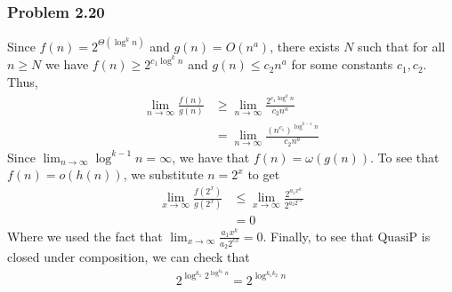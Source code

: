 \subsubsection{Problem 2.20}
Since $f(n) = 2^{\Theta(\log^k n)}$ and $g(n) = O(n^a)$, there exists $N$ such that for all $n \geq N$
we have $f(n) \geq 2^{c_1 \log^k n}$ and $g(n) \leq c_2 n^a$ for some constants $c_1, c_2$. Thus,
\begin{align*}
        \lim_{n \to \infty} \frac{f(n)}{g(n)} &\geq \lim_{n \to \infty} \frac{2^{c_1 \log^k n}}{c_2 n^a} \\
                                              &= \lim_{n \to  \infty} \frac{(n^{c_1})^{\log^{k - 1} n}}{c_2 n^a}
\end{align*}
Since $\lim_{n \to \infty}\log^{k - 1} n = \infty$, we have that $f(n) = \omega(g(n))$. To see that 
$f(n) = o(h(n))$, we substitute $n = 2^x$ to get
\begin{align*}
        \lim_{x \to \infty} \frac{f(2^x)}{g(2^x)} &\leq \lim_{x \to \infty} \frac{2^{a_1 x^k}}{2^{a_2 2^{c x}}} \\
                                                  &= 0
\end{align*}
Where we used the fact that $\lim_{x \to \infty} \frac{a_1 x^k}{a_2 2^{c x}} = 0$. Finally, to see that 
$\text{QuasiP}$ is closed under composition, we can check that 
\begin{align*}
        2^{\log^{k_1} 2^{\log^{k_2} n}} = 2^{\log^{k_1 k_2} n}
\end{align*}

